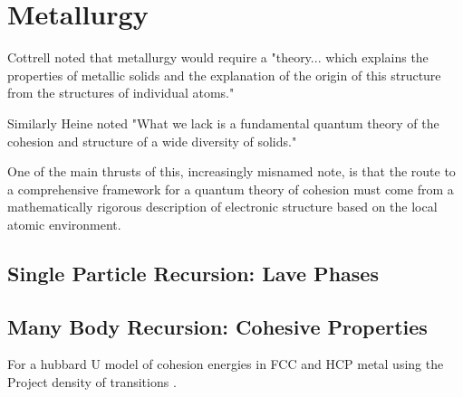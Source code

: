 \chapter{Metallurgy}
  Cottrell noted that metallurgy would require a "theory... which explains
the properties of metallic solids and the explanation of the origin of this
structure from the structures of individual atoms." 

Similarly Heine noted "What we lack is a fundamental quantum 
theory of the cohesion and structure of a wide diversity of solids." 

One of the main thrusts of this, increasingly misnamed note, is that the route
to a comprehensive framework for a quantum theory of cohesion must come
from a mathematically rigorous description of electronic structure based
on the local atomic environment. 

\section{Single Particle Recursion: Lave Phases}

\section{Many Body Recursion: Cohesive Properties}
For a hubbard U model of cohesion energies in FCC and HCP metal using the Project density of transitions
\cite{haydock14}.

